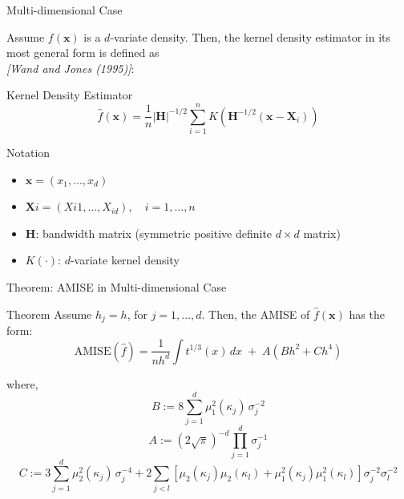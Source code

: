 \begin{frame}{Multi-dimensional Case}

Assume $f(\mathbf{x})$ is a $d$-variate density. Then, the kernel density estimator in its most general form is defined as \\
\textit{[Wand and Jones (1995)]}:

\vspace{0.4cm}

\begin{block}{Kernel Density Estimator}
\[
\hat{f}(\mathbf{x}) = \frac{1}{n} |\mathbf{H}|^{-1/2} \sum_{i=1}^{n} 
K\!\left(\mathbf{H}^{-1/2}(\mathbf{x} - \mathbf{X}_i)\right)
\tag{7}
\]
\end{block}

\vspace{0.3cm}

\begin{block}{Notation}
\begin{itemize}
    \item $\mathbf{x} = (x_1, \dots, x_d)$
    \item $\mathbf{X}i = (X{i1}, \dots, X_{id}), \quad i = 1, \dots, n$
    \item $\mathbf{H}$: bandwidth matrix (symmetric positive definite $d \times d$ matrix)
    \item $K(\cdot)$: $d$-variate kernel density
\end{itemize}
\end{block}

\end{frame}
\begin{frame}{Theorem: AMISE in Multi-dimensional Case}

\begin{block}{Theorem}
Assume $h_j = h$, for $j = 1, \dots, d$. Then, the AMISE of $\hat{f}(\mathbf{x})$ has the form:
\[
\mathrm{AMISE}(\hat{f}) = \frac{1}{n h^{d}} \int t^{1/3}(x)\,dx \;+\; A\left(Bh^{2} + Ch^{4}\right)
\tag{8}
\]

\end{block}
where,
\vspace{-3 mm}
\[
B := 8 \sum_{j=1}^{d} \mu_{1}^{2}(\kappa_j)\,\sigma_{j}^{-2}
\]
\vspace{-3 mm}
\[
A := (2\sqrt{\pi})^{-d} \prod_{j=1}^{d} \sigma_{j}^{-1}
\]
\vspace{-3 mm}
\[
C := 3 \sum_{j=1}^{d} \mu_{2}^{2}(\kappa_j)\,\sigma_{j}^{-4}
+ 2 \sum_{j<l} \left[
\mu_{2}(\kappa_j)\mu_{2}(\kappa_l) 
+ \mu_{1}^{2}(\kappa_j)\mu_{1}^{2}(\kappa_l)
\right]\sigma_{j}^{-2}\sigma_{l}^{-2}
\]


\end{frame}
